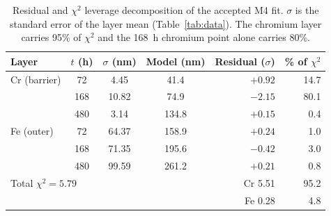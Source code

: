 \documentclass[pdflatex,sn-nature]{sn-jnl}
\begin{document}
\begin{table}[htbp]
\centering
\caption{Residual and $\chi^2$ leverage decomposition of the accepted M4
fit. $\sigma$ is the standard error of the layer mean
(Table~\ref{tab:data}). The chromium layer carries 95\% of $\chi^2$ and
the 168~h chromium point alone carries 80\%.}
\label{tab:leverage}
\begin{tabular}{lcccrr}
\toprule
Layer & $t$ (h) & $\sigma$ (nm) & Model (nm) & Residual ($\sigma$) & \% of $\chi^2$ \\
\midrule
Cr (barrier) & 72 & 4.45 & 41.4 & $+0.92$ & 14.7 \\
 & 168 & 10.82 & 74.9 & $-2.15$ & 80.1 \\
 & 480 & 3.14 & 134.8 & $+0.15$ & 0.4 \\
Fe (outer) & 72 & 64.37 & 158.9 & $+0.24$ & 1.0 \\
 & 168 & 71.35 & 195.6 & $-0.42$ & 3.0 \\
 & 480 & 99.59 & 261.2 & $+0.21$ & 0.8 \\
\midrule
\multicolumn{4}{l}{Total $\chi^2 = 5.79$} & Cr 5.51 & 95.2 \\
\multicolumn{4}{l}{} & Fe 0.28 & 4.8 \\
\bottomrule
\end{tabular}
\end{table}
\end{document}
